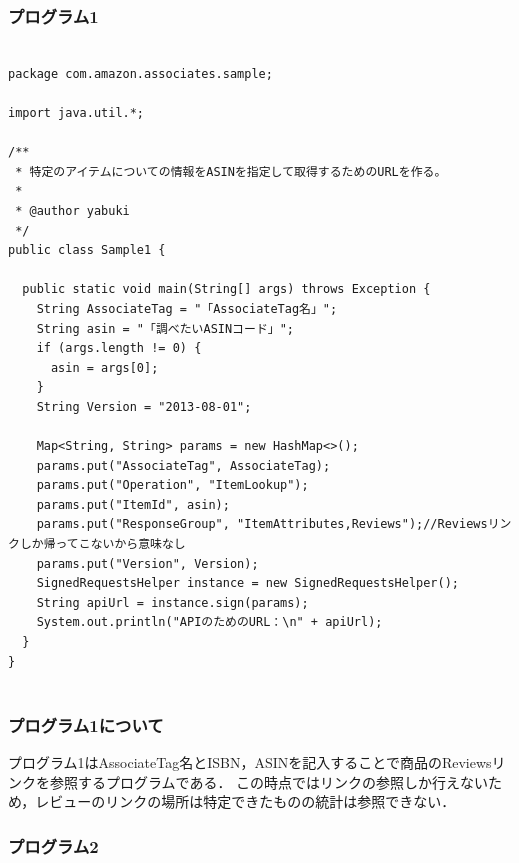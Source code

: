 \clearpage





\subsubsection{プログラム1}


\begin{lstlisting}

package com.amazon.associates.sample;

import java.util.*;

/**
 * 特定のアイテムについての情報をASINを指定して取得するためのURLを作る。
 *
 * @author yabuki
 */
public class Sample1 {

  public static void main(String[] args) throws Exception {
    String AssociateTag = "「AssociateTag名」";
    String asin = "「調べたいASINコード」";
    if (args.length != 0) {
      asin = args[0];
    }
    String Version = "2013-08-01";

    Map<String, String> params = new HashMap<>();
    params.put("AssociateTag", AssociateTag);
    params.put("Operation", "ItemLookup");
    params.put("ItemId", asin);
    params.put("ResponseGroup", "ItemAttributes,Reviews");//Reviewsリンクしか帰ってこないから意味なし
    params.put("Version", Version);
    SignedRequestsHelper instance = new SignedRequestsHelper();
    String apiUrl = instance.sign(params);
    System.out.println("APIのためのURL：\n" + apiUrl);
  }
}


\end{lstlisting}


\subsubsection{プログラム1について}

プログラム1はAssociateTag名とISBN，ASINを記入することで商品のReviewsリンクを参照するプログラムである．
この時点ではリンクの参照しか行えないため，レビューのリンクの場所は特定できたものの統計は参照できない．




\clearpage






\subsubsection{プログラム2}

